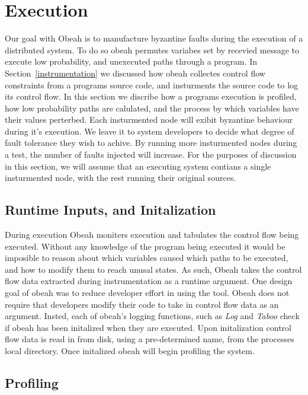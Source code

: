 \section{Execution}
\label{exection}

Our goal with Obeah is to manufacture byzantine faults during the execution of
a distributed system. To do so obeah permutes variabes set by recevied message
to execute low probability, and unexecuted paths through a program. In
Section~\ref{instrumentation} we discussed how obeah collectes control flow
constraints from a programs source code, and insturments the source code to log
its control flow. In this section we discribe how a programs execution is
profiled, how low probability paths are calulated, and the process by which
variables have their values perterbed.  Each insturmented node will exibit
byzantine behaviour during it's execution. We leave it to system developers to
decide what degree of fault tolerance they wish to achive. By running more
insturmented nodes during a test, the number of faults injected will increase.
For the purposes of discussion in this section, we will assume that an
executing system contians a single insturmented node, with the rest running
their original sources.

\subsection{Runtime Inputs, and Initalization}

During execution Obeah moniters execution and tabulates the control flow being
executed. Without any knowledge of the program being executed it would be
imposible to reason about which variables caused which paths to be executed,
and how to modify them to reach unusal states. As such, Obeah takes the control
flow data extracted during instrumentation as a runtime argument. One design
goal of obeah was to reduce developer effort in using the tool. Obeah does not
require that developers modify their code to take in control flow data as an
argument. Insted, each of obeah's logging functions, such as \emph{Log} and
\emph{Taboo} check if obeah has been initalized when they are executed. Upon
initalization control flow data is read in from disk, using a pre-determined
name, from the processes local directory. Once initalized obeah will begin
profiling the system.

\subsection{Profiling}

